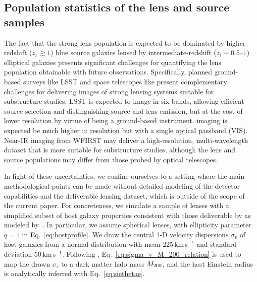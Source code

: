 \documentclass[twocolumn]{aastex62}
\begin{document}
\subsection{Population statistics of the lens and source samples}
\label{sec:populations}

The fact that the strong lens population is expected to be dominated by higher-redshift ($z_s \gtrsim1$) blue source galaxies lensed by intermediate-redshift ($z_l \sim 0.5$--$1$) elliptical galaxies presents significant challenges for quantifying the lens population obtainable with future observations. Specifically, planned ground-based surveys like LSST and space telescopes like \Euclid present complementary challenges for delivering images of strong lensing systems suitable for substructure studies. LSST is expected to image in six bands, allowing efficient source selection and distinguishing source and lens emission, but at the cost of lower resolution by virtue of being a ground-based instrument. \Euclid imaging is expected be much higher in resolution but with a single optical passband (VIS). Near-IR imaging from WFIRST may deliver a high-resolution, multi-wavelength dataset that is more suitable for substructure studies, although the lens and source populations may differ from those probed by optical telescopes.


In light of these uncertainties, we confine ourselves to a setting where the main methodological points can be made without detailed modeling of the detector capabilities and the deliverable lensing dataset, which is outside of the scope of the current paper. For concreteness, we simulate a sample of lenses with a simplified subset of host galaxy properties consistent with those deliverable by \Euclid as modeled by~\citet{2015ApJ...811...20C}. In particular, we assume spherical lenses, with ellipticity parameter $q=1$ in Eq.~\eqref{eq:hostprofile}. We draw the central 1-D velocity dispersions $\sigma_v$ of host galaxies from a normal distribution with mean 225\,km\,s$^{-1}$ and standard deviation 50\,km\,s$^{-1}$. Following \citet{2018ApJ...859...96Z}, Eq.~\eqref{eq:sigma_v_M_200_relation} is used to map the drawn $\sigma_v$ to a dark matter halo mass $M_{200}$, and the host Einstein radius is analytically inferred with Eq.~\eqref{eq:siethetae}.
\end{document}
